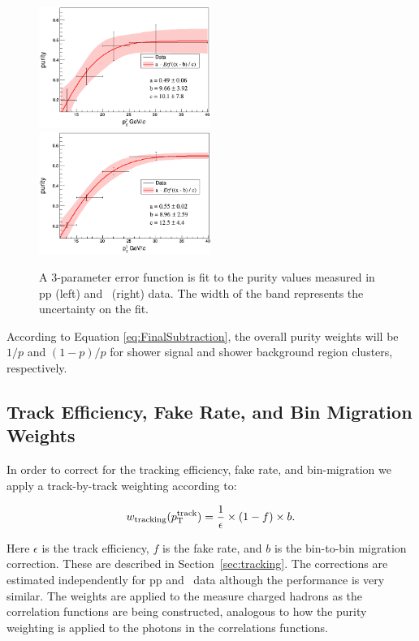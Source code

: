 \begin{figure}
  \includegraphics[width=0.5\textwidth]{Data_Analysis/Error_Function_Fits/pp_Mean_Center}
  \includegraphics[width=0.5\textwidth]{Data_Analysis/Error_Function_Fits/pPb_Mean_Centers}
  \caption{A 3-parameter error function is fit to the purity values measured in pp (left) and \pPb~(right) data. The width of the band represents the uncertainty on the fit.}
  \label{fig:Purity_Error_Function_analysis}
\end{figure}


According to Equation \ref{eq:FinalSubtraction}, the overall purity weights will be $1/p$ and $(1-p)/p$ for shower signal and shower background region clusters, respectively. 

\subsection{Track Efficiency, Fake Rate, and Bin Migration Weights}
In order to correct for the tracking efficiency, fake rate, and bin-migration we apply a track-by-track weighting according to:

\begin{equation}
  w_{\mathrm{tracking}}(p_{\mathrm{T}}^{\mathrm{track}}) = \frac{1}{\epsilon}\times(1- f)\times b.
\end{equation}

Here $\epsilon$ is the track efficiency, $f$ is the fake rate, and $b$ is the bin-to-bin migration correction. These are described in Section~\ref{sec:tracking}. The corrections are estimated independently for pp and \pPb~data although the performance is very similar. The weights are applied to the measure charged hadrons as the correlation functions are being constructed, analogous to how the purity weighting is applied to the photons in the correlations functions.

